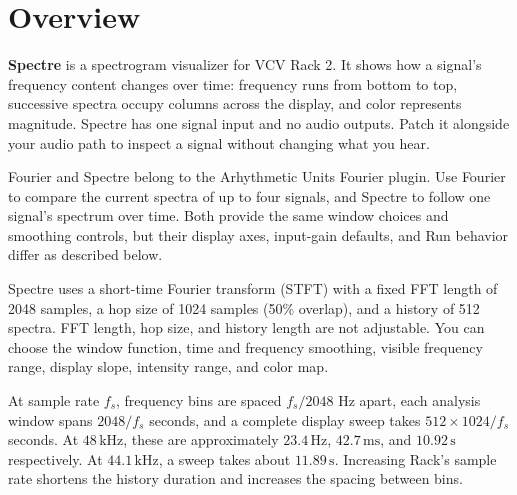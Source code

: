 \section{Overview}\label{sec:overview}

\textbf{Spectre} is a spectrogram visualizer for VCV Rack 2. It shows how a
signal's frequency content changes over time: frequency runs from bottom to
top, successive spectra occupy columns across the display, and color
represents magnitude. Spectre has one signal input and no audio outputs.
Patch it alongside your audio path to inspect a signal without changing what
you hear.

Fourier and Spectre belong to the Arhythmetic Units Fourier plugin. Use
Fourier to compare the current spectra of up to four signals, and Spectre to
follow one signal's spectrum over time. Both provide the same window choices
and smoothing controls, but their display axes, input-gain defaults, and Run
behavior differ as described below.

Spectre uses a short-time Fourier transform (STFT) with a fixed FFT length of
2048 samples, a hop size of 1024 samples (50\% overlap), and a history of 512
spectra. FFT length, hop size, and history length are not adjustable. You can
choose the window function, time and frequency smoothing, visible frequency
range, display slope, intensity range, and color map.

At sample rate $f_s$, frequency bins are spaced $f_s/2048$ Hz apart, each
analysis window spans $2048/f_s$ seconds, and a complete display sweep takes
$512 \times 1024/f_s$ seconds. At $48\,\mathrm{kHz}$, these are approximately
$23.4\,\mathrm{Hz}$, $42.7\,\mathrm{ms}$, and $10.92\,\mathrm{s}$
respectively. At $44.1\,\mathrm{kHz}$, a sweep takes about
$11.89\,\mathrm{s}$. Increasing Rack's sample rate shortens the history
duration and increases the spacing between bins.

